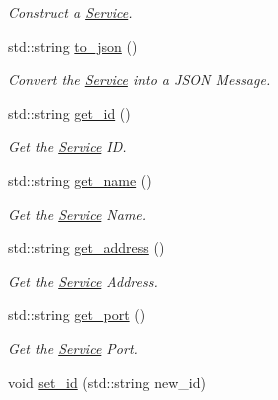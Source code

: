 \begin{DoxyCompactItemize}
\begin{DoxyCompactList}\small\item\em Construct a \hyperlink{classService}{Service}. \end{DoxyCompactList}\item 
std\-::string \hyperlink{classService_a4a9e3ab8b1e7c82a7f624022906410f4}{to\-\_\-json} ()
\begin{DoxyCompactList}\small\item\em Convert the \hyperlink{classService}{Service} into a J\-S\-O\-N Message. \end{DoxyCompactList}\item 
\hypertarget{classService_adefcc615297a9cd243767f699468edb7}{std\-::string \hyperlink{classService_adefcc615297a9cd243767f699468edb7}{get\-\_\-id} ()}\label{classService_adefcc615297a9cd243767f699468edb7}

\begin{DoxyCompactList}\small\item\em Get the \hyperlink{classService}{Service} I\-D. \end{DoxyCompactList}\item 
\hypertarget{classService_a8b492e0a62e0457a8c5395fbcaa86c15}{std\-::string \hyperlink{classService_a8b492e0a62e0457a8c5395fbcaa86c15}{get\-\_\-name} ()}\label{classService_a8b492e0a62e0457a8c5395fbcaa86c15}

\begin{DoxyCompactList}\small\item\em Get the \hyperlink{classService}{Service} Name. \end{DoxyCompactList}\item 
\hypertarget{classService_acf3e71a82be6a4ba3915ad2039099da6}{std\-::string \hyperlink{classService_acf3e71a82be6a4ba3915ad2039099da6}{get\-\_\-address} ()}\label{classService_acf3e71a82be6a4ba3915ad2039099da6}

\begin{DoxyCompactList}\small\item\em Get the \hyperlink{classService}{Service} Address. \end{DoxyCompactList}\item 
\hypertarget{classService_acca3fc5199b3e85ce7a0cc875e515b72}{std\-::string \hyperlink{classService_acca3fc5199b3e85ce7a0cc875e515b72}{get\-\_\-port} ()}\label{classService_acca3fc5199b3e85ce7a0cc875e515b72}

\begin{DoxyCompactList}\small\item\em Get the \hyperlink{classService}{Service} Port. \end{DoxyCompactList}\item 
\hypertarget{classService_a2ea702a686d8561b43f6283647e18109}{void \hyperlink{classService_a2ea702a686d8561b43f6283647e18109}{set\-\_\-id} (std\-::string new\-\_\-id)}\label{classService_a2ea702a686d8561b43f6283647e18109}


\end{DoxyCompactItemize}
